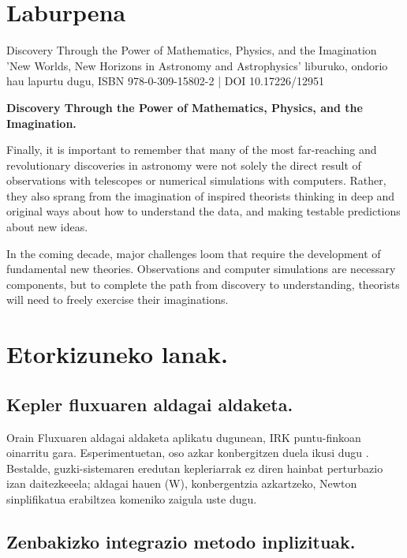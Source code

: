 



\section*{Laburpena}

Discovery Through the Power of Mathematics, Physics, and the Imagination
'New Worlds, New Horizons in Astronomy and Astrophysics' liburuko, ondorio hau lapurtu dugu,
ISBN 978-0-309-15802-2 | DOI 10.17226/12951

\begin{displayquote}
\textbf{Discovery Through the Power of Mathematics, Physics, and the Imagination.}

Finally, it is important to remember that many of the most far-reaching and revolutionary discoveries in astronomy were not solely the direct result of observations with telescopes or numerical simulations with computers. Rather, they also sprang from the imagination of inspired theorists thinking in deep and original ways about how to understand the data, and making testable predictions about new ideas.

In the coming decade, major challenges loom that require the development of fundamental new theories. Observations and computer simulations are necessary components, but to complete the path from discovery to understanding, theorists will need to freely exercise their imaginations.
\end{displayquote}


\section{Etorkizuneko lanak.}

\subsection*{Kepler fluxuaren aldagai aldaketa.}

Orain Fluxuaren aldagai aldaketa aplikatu dugunean, IRK puntu-finkoan oinarritu gara. Esperimentuetan, oso azkar konbergitzen duela ikusi dugu . Bestalde, guzki-sistemaren eredutan kepleriarrak ez diren hainbat perturbazio izan daitezkeeela; aldagai hauen (W), konbergentzia
azkartzeko, Newton sinplifikatua erabiltzea komeniko zaigula uste dugu.

\subsection*{Zenbakizko integrazio metodo inplizituak.}

